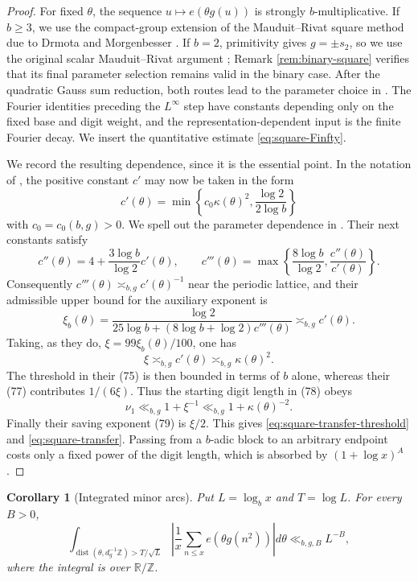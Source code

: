 \documentclass[11pt,reqno]{amsart}
\theoremstyle{plain}
\newtheorem{corollary}[theorem]{Corollary}
\theoremstyle{definition}
\newcommand{\Z}{\mathbb{Z}}
\newcommand{\R}{\mathbb{R}}
\newcommand{\ee}[1]{e\!\left(#1\right)}
\newcommand{\1}{\mathbf 1}
\DeclareMathOperator{\dist}{dist}
\begin{document}
\begin{proof}
For fixed $\theta$, the sequence $u\mapsto\ee{\theta g(u)}$ is strongly $b$-multiplicative.  If $b\ge3$, we use the compact-group extension of the Mauduit--Rivat square method due to Drmota and Morgenbesser \cite{drmotamorgenbesser}.  If $b=2$, primitivity gives $g=\pm s_2$, so we use the original scalar Mauduit--Rivat argument \cite{mauduitrivat-squares}; Remark \ref{rem:binary-square} verifies that its final parameter selection remains valid in the binary case.  After the quadratic Gauss sum reduction, both routes lead to the parameter choice in \cite[\S\S5.5--5.8]{mauduitrivat-squares}.  The Fourier identities preceding the $L^\infty$ step have constants depending only on the fixed base and digit weight, and the representation-dependent input is the finite Fourier decay.  We insert the quantitative estimate \eqref{eq:square-Finfty}.

We record the resulting dependence, since it is the essential point.  In the notation of \cite[(66)]{mauduitrivat-squares}, the positive constant $c'$ may now be taken in the form
\begin{equation}\label{eq:cprime-square}
 c'(\theta)=\min\left\{c_0\kappa(\theta)^2,
 \frac{\log2}{2\log b}\right\}
\end{equation}
with $c_0=c_0(b,g)>0$.  We spell out the parameter dependence in \cite[(74)--(79)]{mauduitrivat-squares}.  Their next constants satisfy
\[
 c''(\theta)=4+\frac{3\log b}{\log2}c'(\theta),
 \qquad
 c'''(\theta)=\max\left\{\frac{8\log b}{\log2},
 \frac{c''(\theta)}{c'(\theta)}\right\}.
\]
Consequently $c'''(\theta)\asymp_{b,g}c'(\theta)^{-1}$ near the periodic lattice, and their admissible upper bound for the auxiliary exponent is
\[
 \xi_b(\theta)=
 \frac{\log2}{25\log b+(8\log b+\log2)c'''(\theta)}
 \asymp_{b,g}c'(\theta).
\]
Taking, as they do, $\xi=99\xi_b(\theta)/100$, one has
\[
 \xi\asymp_{b,g}c'(\theta)\asymp_{b,g}\kappa(\theta)^2.
\]
The threshold in their (75) is then bounded in terms of $b$ alone, whereas their (77) contributes $1/(6\xi)$.  Thus the starting digit length in (78) obeys
\[
 \nu_1\ll_{b,g}1+\xi^{-1}
 \ll_{b,g}1+\kappa(\theta)^{-2}.
\]
Finally their saving exponent (79) is $\xi/2$.  This gives \eqref{eq:square-transfer-threshold} and \eqref{eq:square-transfer}.  Passing from a $b$-adic block to an arbitrary endpoint costs only a fixed power of the digit length, which is absorbed by $(1+\log x)^A$.
\end{proof}

\begin{corollary}[Integrated minor arcs]\label{cor:square-minor}
Put $L=\log_bx$ and $T=\log L$.  For every $B>0$,
\begin{equation}\label{eq:square-minor}
 \int_{\dist(\theta,d_g^{-1}\Z)>T/\sqrt L}
 \left|\frac1x\sum_{n\le x}\ee{\theta g(n^2)}\right|d\theta
 \ll_{b,g,B}L^{-B},
\end{equation}
where the integral is over $\R/\Z$.
\end{corollary}
\end{document}
